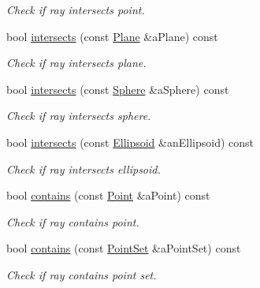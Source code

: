 \begin{DoxyCompactItemize}
\begin{DoxyCompactList}\small\item\em Check if ray intersects point. \end{DoxyCompactList}\item 
bool \hyperlink{classlibrary_1_1math_1_1geom_1_1d3_1_1objects_1_1_ray_ade9febdb0da483a04f3a4d379c48b6d7}{intersects} (const \hyperlink{classlibrary_1_1math_1_1geom_1_1d3_1_1objects_1_1_plane}{Plane} \&a\+Plane) const
\begin{DoxyCompactList}\small\item\em Check if ray intersects plane. \end{DoxyCompactList}\item 
bool \hyperlink{classlibrary_1_1math_1_1geom_1_1d3_1_1objects_1_1_ray_ab75f38e9f6f0e7160acdf5360089937b}{intersects} (const \hyperlink{classlibrary_1_1math_1_1geom_1_1d3_1_1objects_1_1_sphere}{Sphere} \&a\+Sphere) const
\begin{DoxyCompactList}\small\item\em Check if ray intersects sphere. \end{DoxyCompactList}\item 
bool \hyperlink{classlibrary_1_1math_1_1geom_1_1d3_1_1objects_1_1_ray_a691d9fda5c22f8cef0b412b9173fe71b}{intersects} (const \hyperlink{classlibrary_1_1math_1_1geom_1_1d3_1_1objects_1_1_ellipsoid}{Ellipsoid} \&an\+Ellipsoid) const
\begin{DoxyCompactList}\small\item\em Check if ray intersects ellipsoid. \end{DoxyCompactList}\item 
bool \hyperlink{classlibrary_1_1math_1_1geom_1_1d3_1_1objects_1_1_ray_a6179dc1453ac7a54b13fe6bf46c0a66b}{contains} (const \hyperlink{classlibrary_1_1math_1_1geom_1_1d3_1_1objects_1_1_point}{Point} \&a\+Point) const
\begin{DoxyCompactList}\small\item\em Check if ray contains point. \end{DoxyCompactList}\item 
bool \hyperlink{classlibrary_1_1math_1_1geom_1_1d3_1_1objects_1_1_ray_a4766780e22a8113ff63b85c8af32e915}{contains} (const \hyperlink{classlibrary_1_1math_1_1geom_1_1d3_1_1objects_1_1_point_set}{Point\+Set} \&a\+Point\+Set) const
\begin{DoxyCompactList}\small\item\em Check if ray contains point set. \end{DoxyCompactList}\item 

\end{DoxyCompactItemize}

